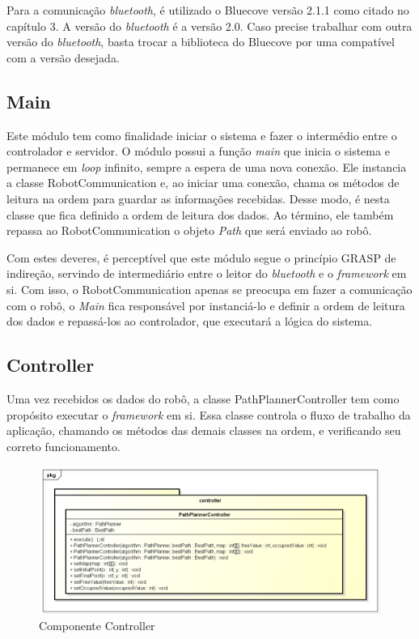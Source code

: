 Para a comunicação \textit{bluetooth}, é utilizado o Bluecove versão 2.1.1 como citado no capítulo 3. A versão do \textit{bluetooth} é a versão 2.0. Caso precise trabalhar com outra versão do \textit{bluetooth}, basta trocar a biblioteca do Bluecove por uma compatível com a versão desejada.

\subsection{Main}

Este módulo tem como finalidade iniciar o sistema e fazer o intermédio entre o controlador e servidor. O módulo possui a função \textit{main} que inicia o sistema e permanece em  \textit{loop} infinito, sempre a espera de uma nova conexão. Ele instancia a classe RobotCommunication e, ao iniciar uma conexão, chama os métodos de leitura na ordem para guardar as informações recebidas. Desse modo, é nesta classe que fica definido a ordem de leitura dos dados. Ao término, ele também repassa ao RobotCommunication o objeto \textit{Path} que será enviado ao robô.

Com estes deveres, é perceptível que este módulo segue o princípio GRASP de indireção, servindo de intermediário entre o leitor do \textit{bluetooth} e o \textit{framework} em si. Com isso, o RobotCommunication apenas se preocupa em fazer a comunicação com o robô, o \textit{Main} fica responsável por instanciá-lo e definir a ordem de leitura dos dados e repassá-los ao controlador, que executará a lógica do sistema.

\subsection{Controller}

Uma vez recebidos os dados do robô, a classe PathPlannerController tem como propósito executar o \textit{framework} em si. Essa classe controla o fluxo de trabalho da aplicação, chamando os métodos das demais classes na ordem, e verificando seu correto funcionamento.

\begin{figure}[h]
	\centering
	\label{fig25}
		\includegraphics[keepaspectratio=true,scale=0.6]{figuras/pkgcontroller.png}
	\caption{Componente Controller}
\end{figure}

